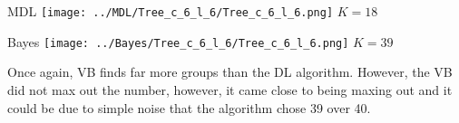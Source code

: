 \begin{minipage}{0.45\linewidth}
MDL
\centering
\texttt{[image: ../MDL/Tree\_c\_6\_l\_6/Tree\_c\_6\_l\_6.png]}
$K=18$

\end{minipage}
\begin{minipage}{0.45\linewidth}
Bayes
\centering
\texttt{[image: ../Bayes/Tree\_c\_6\_l\_6/Tree\_c\_6\_l\_6.png]}
$K=39$
\end{minipage}
\vspace{10pt}

Once again, VB finds far more groups than the DL algorithm. However, the VB
did not max out the number, however, it came close to being maxing out and
it could be due to simple noise that the algorithm chose 39 over 40.
